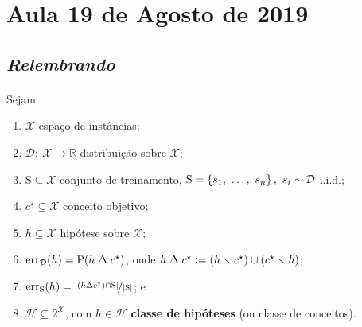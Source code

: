 { %

\usetikzlibrary{arrows, positioning, shapes}    %

\newcommand{\given}{\,\middle|\,}               %

\newcommand{\Reals}{\mathds{R}}                 %

\newcommand{\defeq}{\vcentcolon=}               %
\newcommand{\eqdef}{=\vcentcolon}               %

\renewcommand{\l}{\mathopen{}\left}             %
\renewcommand{\r}{\vphantom{1j}\right}          %

\cleardoublepage
\section{Aula 19 de Agosto de 2019}
\label{2019_08_19}

\subsection*{\it Relembrando}

\paragraph{\nopunct} Sejam
\begin{enumerate}
  \item $\mathcal{X}$ espaço de instâncias;
  \item $\mathcal{D}\colon\ \mathcal{X}\mapsto\Reals$ distribuição sobre $\mathcal{X}$;
  \item $\mathrm{S}\subseteq\mathcal{X}$ conjunto de treinamento, $\mathrm{S}=\l\{s_1,\ \ldots,\ s_n\r\},\ s_i\sim\mathcal{D}$ i.i.d.;
  \item $c^\star\subseteq\mathcal{X}$ conceito objetivo;
  \item $h\subseteq\mathcal{X}$ hipótese sobre $\mathcal{X}$;
  \item $\mathrm{err}_\mathcal{D}\l(h\r)=\mathrm{P}\l(h\mathrel{\Delta}c^\star\r)$, onde $h\mathrel{\Delta}c^\star\defeq\l(h\setminus c^\star\r)\cup\l(c^\star\setminus h\r)$;
  \item $\mathrm{err}_\mathrm{S}\l(h\r)=\nicefrac{\l|\l(h\mathrel{\Delta}c^\star\r)\cap\mathrm{S}\r|}{\l|\mathrm{S}\r|}$; e
  \item $\mathcal{H}\subseteq 2^\mathcal{X}$, com $h\in\mathcal{H}$ \textbf{classe de hipóteses} (ou classe de conceitos).
\end{enumerate}

}
